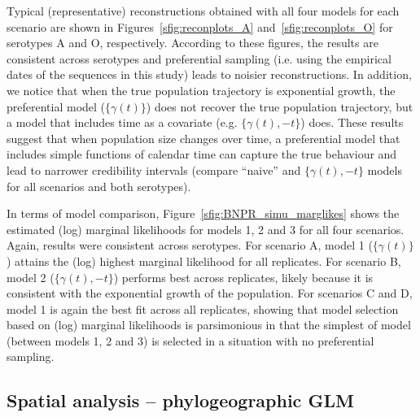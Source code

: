\documentclass[a4paper,10pt]{article}
\begin{document}
Typical (representative) reconstructions obtained with all four models for each scenario are shown in Figures~\ref{sfig:reconplots_A} and~\ref{sfig:reconplots_O} for serotypes A and O, respectively.
According to these figures, the results are consistent across serotypes and preferential sampling (i.e. using the empirical dates of the sequences in this study) leads to noisier reconstructions.
In addition, we notice that when the true population trajectory is exponential growth, the preferential model ($\{\gamma(t)\}$) does not recover the true population trajectory, but a model that includes time as a covariate (e.g. $\{\gamma(t), -t\}$) does.
These results suggest that when population size changes over time, a preferential model that includes simple functions of calendar time can capture the true behaviour and lead to narrower credibility intervals (compare ``naive'' and $\{\gamma(t), -t\}$ models for all scenarios and both serotypes).

In terms of model comparison, Figure~\ref{sfig:BNPR_simu_marglikes} shows the estimated (log) marginal likelihoods for models 1, 2 and 3 for all four scenarios.
Again, results were consistent across serotypes. 
For scenario A, model 1 ($ \{ \gamma(t) \}$) attains the (log) highest marginal likelihood for all replicates.
For scenario B, model 2 ($ \{ \gamma(t), -t\}$) performs best across replicates, likely because it is consistent with the exponential growth of the population.
For scenarios C and D, model 1 is again the best fit across all replicates, showing that model selection based on (log) marginal likelihoods is parsimonious in that the simplest of model (between models 1, 2 and 3) is selected in a situation with no preferential sampling.

\subsection*{Spatial analysis -- phylogeographic GLM}
\end{document}
